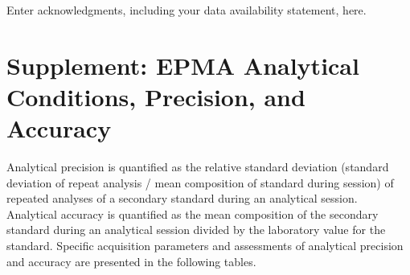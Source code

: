 \documentclass[draft]{agujournal2019}
\begin{document}
\acknowledgments
Enter acknowledgments, including your data availability statement, here.


\appendix
\section{Supplement: EPMA Analytical Conditions, Precision, and Accuracy}

\label{supplement:a}
Analytical precision is quantified as the relative standard deviation (standard deviation of repeat analysis / mean composition of standard during session) of repeated analyses of a secondary standard during an analytical session. Analytical accuracy is quantified as the mean composition of the secondary standard during an analytical session divided by the laboratory value for the standard. Specific acquisition parameters and assessments of analytical precision and accuracy are presented in the following tables. 
\end{document}
